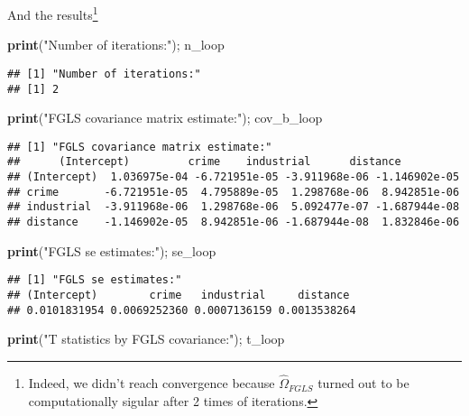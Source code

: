 \documentclass[
  12pt,
]{article}
\newenvironment{Shaded}{\begin{snugshade}}{\end{snugshade}}
\newcommand{\KeywordTok}[1]{\textcolor[rgb]{0.13,0.29,0.53}{\textbf{#1}}}
\newcommand{\NormalTok}[1]{#1}
\newcommand{\StringTok}[1]{\textcolor[rgb]{0.31,0.60,0.02}{#1}}
\begin{document}
And the results\footnote{Indeed, we didn't reach convergence because $\hat{\Omega}_{FGLS}$ turned out to be computationally sigular after 2 times of iterations.}

\begin{Shaded}
\begin{Highlighting}[]
\KeywordTok{print}\NormalTok{(}\StringTok{"Number of iterations:"}\NormalTok{); n\_loop}
\end{Highlighting}
\end{Shaded}

\begin{Verbatim}
## [1] "Number of iterations:"
## [1] 2
\end{Verbatim}

\begin{Shaded}
\begin{Highlighting}[]
\KeywordTok{print}\NormalTok{(}\StringTok{"FGLS covariance matrix estimate:"}\NormalTok{); cov\_b\_loop}
\end{Highlighting}
\end{Shaded}

\begin{Verbatim}
## [1] "FGLS covariance matrix estimate:"
##      (Intercept)         crime    industrial      distance
## (Intercept)  1.036975e-04 -6.721951e-05 -3.911968e-06 -1.146902e-05
## crime       -6.721951e-05  4.795889e-05  1.298768e-06  8.942851e-06
## industrial  -3.911968e-06  1.298768e-06  5.092477e-07 -1.687944e-08
## distance    -1.146902e-05  8.942851e-06 -1.687944e-08  1.832846e-06
\end{Verbatim}

\begin{Shaded}
\begin{Highlighting}[]
\KeywordTok{print}\NormalTok{(}\StringTok{"FGLS se estimates:"}\NormalTok{); se\_loop}
\end{Highlighting}
\end{Shaded}

\begin{Verbatim}
## [1] "FGLS se estimates:"
## (Intercept)        crime   industrial     distance 
## 0.0101831954 0.0069252360 0.0007136159 0.0013538264 
\end{Verbatim}

\begin{Shaded}
\begin{Highlighting}[]
\KeywordTok{print}\NormalTok{(}\StringTok{"T statistics by FGLS covariance:"}\NormalTok{); t\_loop}
\end{Highlighting}
\end{Shaded}
\end{document}
